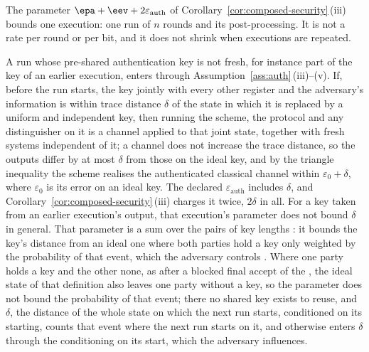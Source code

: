 \begin{remark}\label{rem:repeated-executions}
The parameter $\epa+\eev+2\varepsilon_{\mathrm{auth}}$ of
Corollary~\ref{cor:composed-security}\,(iii) bounds one execution: one run
of $n$ rounds and its post-processing. It is not a rate per round or per
bit, and it does not shrink when executions are repeated.

A run whose pre-shared authentication key is not fresh, for instance part of
the key of an earlier execution, enters through
Assumption~\ref{ass:auth}\,(iii)--(v). If, before the run starts, the key
jointly with every other register and the adversary's information is within
trace distance $\delta$ of the state in which it is replaced by a uniform and
independent key, then running the scheme, the protocol and any
distinguisher on it is a channel applied to that joint state, together with
fresh systems independent of it; a channel does not increase the trace
distance, so the outputs differ by at most $\delta$ from those on the ideal
key, and by the triangle inequality the scheme realises the authenticated
classical channel within $\varepsilon_0+\delta$, where $\varepsilon_0$ is its
error on an ideal key. The declared $\varepsilon_{\mathrm{auth}}$ includes
$\delta$, and Corollary~\ref{cor:composed-security}\,(iii) charges it twice,
$2\delta$ in all. For a key taken from an earlier execution's output, that
execution's parameter does not bound $\delta$ in general. That parameter is
a sum over the pairs of key lengths
\cite[Sec.~3.3, Def.~3.8, Eqs.~(11), (17)]{tupkary2026decoy}: it bounds the
key's distance from an ideal one where both parties hold a key only
weighted by the probability of that event, which the adversary controls
\cite[Sec.~2.3, Remark~2.1]{tupkary2025survey}. Where one party holds a key
and the other none, as after a blocked final $\mathrm{accept}$ of the
, the ideal state of that definition
also leaves one party without a key, so the parameter does not bound the
probability of that event; there no shared key exists to reuse, and
$\delta$, the distance of the whole state on which the next run starts,
conditioned on its starting, counts that event where the next run starts
on it, and otherwise enters $\delta$ through the conditioning on its
start, which the adversary influences.


\end{remark}
